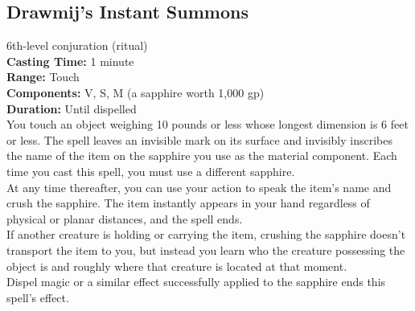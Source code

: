 \documentclass[11pt, A4paper, english]{article}
\begin{document}
		\subsection{Drawmij’s Instant Summons}
6th-level conjuration (ritual) \\
\textbf{Casting Time:} 1 minute \\
\textbf{Range:} Touch \\
\textbf{Components:} V, S, M (a sapphire worth 1,000 gp) \\
\textbf{Duration:} Until dispelled \\
You touch an object weighing 10 pounds or less whose longest dimension is 6 feet or less. The spell leaves an invisible mark on its surface and invisibly inscribes the name of the item on the sapphire you use as the material component. Each time you cast this spell, you must use a different sapphire. \\
At any time thereafter, you can use your action to speak the item’s name and crush the sapphire. The item instantly appears in your hand regardless of physical or planar distances, and the spell ends. \\
If another creature is holding or carrying the item, crushing the sapphire doesn't transport the item to you, but instead you learn who the creature possessing the object is and roughly where that creature is located at that moment. \\
Dispel magic or a similar effect successfully applied to the sapphire ends this spell's effect.
\end{document}
